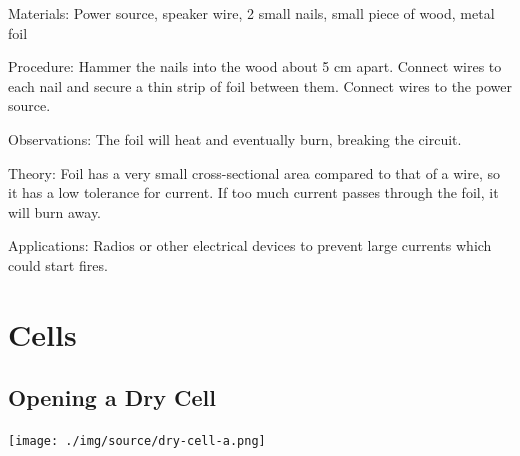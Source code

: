 \begin{multicols}{2}
\begin{description*}
\item[Materials:]{Power source, speaker wire, 2 small nails, small piece of wood, metal foil}
\item[Procedure:]{Hammer the nails into the wood about 5 cm apart. Connect wires to each nail and secure a thin strip of foil between them. Connect wires to the power source.}
\item[Observations:]{The foil will heat and eventually burn, breaking the circuit.}
\item[Theory:]{Foil has a very small cross-sectional area compared to that of a wire, so it has a low tolerance for current. If too much current passes through the foil, it will burn away.}
\item[Applications:]{Radios or other electrical devices to prevent large currents which could start fires.}
\end{description*}


\section*{Cells}


\subsection{Opening a Dry Cell}

\begin{center}
\texttt{[image: ./img/source/dry-cell-a.png]}
\end{center}


\end{multicols}
